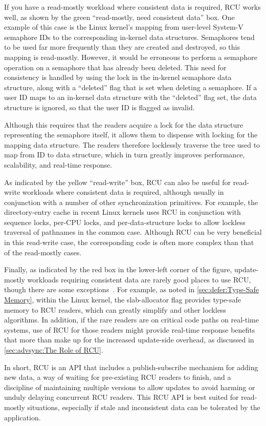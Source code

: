 If you have a read-mostly workload where consistent data is required,
RCU works well, as shown by the green ``read-mostly, need consistent data''
box.
One example of this case is the Linux kernel's mapping from user-level
System-V semaphore IDs to the corresponding in-kernel data structures.
Semaphores tend to be used far more frequently than they are created
and destroyed, so this mapping is read-mostly.
However, it would be erroneous to perform a semaphore operation on
a semaphore that has already been deleted.
This need for consistency is handled by using the lock in the
in-kernel semaphore data structure, along with a ``deleted''
flag that is set when deleting a semaphore.
If a user ID maps to an in-kernel data structure with the
``deleted'' flag set, the data structure is ignored, so that
the user ID is flagged as invalid.

Although this requires that the readers acquire a lock for the
data structure representing the semaphore itself,
it allows them to dispense with locking for the
mapping data structure.
The readers therefore locklessly
traverse the tree used to map from ID to data structure,
which in turn greatly improves performance, scalability, and
real-time response.

As indicated by the yellow ``read-write'' box, RCU can also be useful
for read-write
workloads where consistent data is required, although usually in
conjunction with a number of other synchronization primitives.
For example, the directory-entry cache in recent Linux kernels uses RCU in
conjunction with sequence locks, per-CPU locks, and per-data-structure
locks to allow lockless traversal of pathnames in the common case.
Although RCU can be very beneficial in this read-write case, the
corresponding code is often more complex than that of the read-mostly
cases.

Finally, as indicated by the red box in the lower-left corner
of the figure, update-mostly workloads requiring consistent
data are rarely good places to use RCU, though there are some
exceptions~\cite{MathieuDesnoyers2012URCU}.
For example, as noted in
\cref{sec:defer:Type-Safe Memory},
within the Linux kernel, the 
slab-allocator flag provides type-safe memory to RCU readers, which can
greatly simplify  and other lockless
algorithms.
In addition, if the rare readers are on critical code paths on real-time
systems, use of RCU for those readers might provide real-time response
benefits that more than make up for the increased update-side overhead,
as discussed in \cref{sec:advsync:The Role of RCU}.

In short, RCU is an API that includes a publish-subscribe mechanism for
adding new data, a way of waiting for pre-existing RCU readers to finish,
and a discipline of maintaining multiple versions to allow updates to
avoid harming or unduly delaying concurrent RCU readers.
This RCU API is best suited for read-mostly situations, especially if
stale and inconsistent data can be tolerated by the application.
